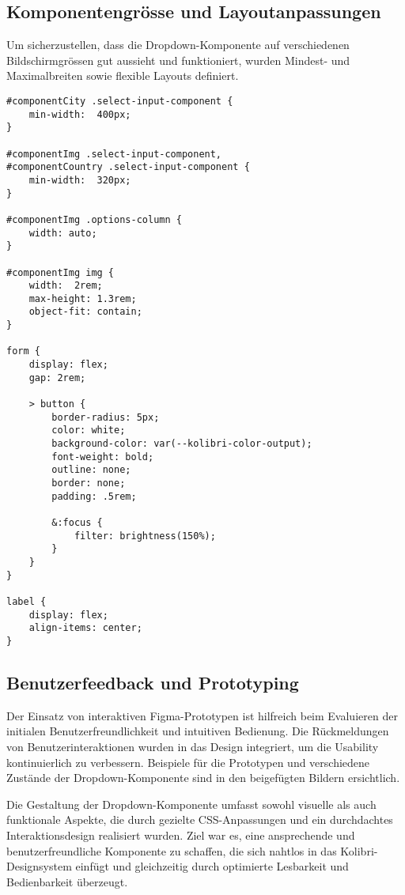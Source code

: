 \subsection{Komponentengrösse und Layoutanpassungen}

Um sicherzustellen, dass die Dropdown-Komponente auf verschiedenen Bildschirmgrössen gut aussieht und funktioniert, wurden Mindest- und Maximalbreiten sowie flexible Layouts definiert.

\begin{lstlisting}[style = htmlcssjs, caption = Flexible Layouts für Demo-Page, label = code:layoutDemoPage]
#componentCity .select-input-component {
    min-width:  400px;
}

#componentImg .select-input-component,
#componentCountry .select-input-component {
    min-width:  320px;
}

#componentImg .options-column {
    width: auto;
}

#componentImg img {
    width:  2rem;
    max-height: 1.3rem;
    object-fit: contain;
}

form {
    display: flex;
    gap: 2rem;
 
    > button {
        border-radius: 5px;
        color: white;
        background-color: var(--kolibri-color-output);
        font-weight: bold;
        outline: none;
        border: none;
        padding: .5rem;
 
        &:focus {
            filter: brightness(150%);
        }
    }
}

label {
    display: flex;
    align-items: center;
}
\end{lstlisting}


\subsection{Benutzerfeedback und Prototyping}

Der Einsatz von interaktiven Figma-Prototypen ist hilfreich beim Evaluieren der initialen Benutzerfreundlichkeit und intuitiven Bedienung. 
Die Rückmeldungen von Benutzerinteraktionen wurden in das Design integriert, um die Usability kontinuierlich zu verbessern. 
Beispiele für die Prototypen und verschiedene Zustände der Dropdown-Komponente sind in den beigefügten Bildern ersichtlich.

Die Gestaltung der Dropdown-Komponente umfasst sowohl visuelle als auch funktionale Aspekte, die durch gezielte CSS-Anpassungen und ein durchdachtes Interaktionsdesign realisiert wurden. 
Ziel war es, eine ansprechende und benutzerfreundliche Komponente zu schaffen, die sich nahtlos in das Kolibri-Designsystem einfügt und gleichzeitig durch optimierte Lesbarkeit und Bedienbarkeit überzeugt.


